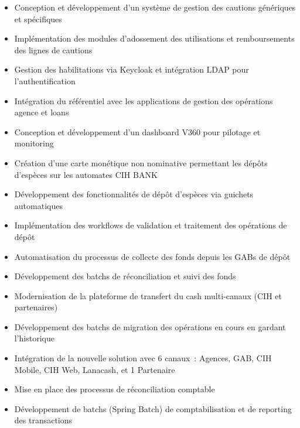 \begin{itemize}
    \item Conception et développement d'un système de gestion des cautions génériques et spécifiques
    \item Implémentation des modules d'adossement des utilisations et remboursements des lignes de cautions
    \item Gestion des habilitations via Keycloak et intégration LDAP pour l'authentification
    \item Intégration du référentiel avec les applications de gestion des opérations agence et loans
    \item Conception et développement d'un dashboard V360 pour pilotage et monitoring
\end{itemize}

\begin{itemize}
    \item Création d'une carte monétique non nominative permettant les dépôts d'espèces sur les automates CIH BANK
    \item Développement des fonctionnalités de dépôt d'espèces via guichets automatiques
    \item Implémentation des workflows de validation et traitement des opérations de dépôt
\end{itemize}

\begin{itemize}
    \item Automatisation du processus de collecte des fonds depuis les GABs de dépôt
    \item Développement des batchs de réconciliation et suivi des fonds
\end{itemize}

\begin{itemize}
    \item Modernisation de la plateforme de transfert du cash multi-canaux (CIH et partenaires)
    \item Développement des batchs de migration des opérations en cours en gardant l'historique
    \item Intégration de la nouvelle solution avec 6 canaux~: Agences, GAB, CIH Mobile, CIH Web, Lanacash, et 1 Partenaire
\end{itemize}

\begin{itemize}
    \item Mise en place des processus de réconciliation comptable
    \item Développement de batchs (Spring Batch) de comptabilisation et de reporting des transactions
\end{itemize}

